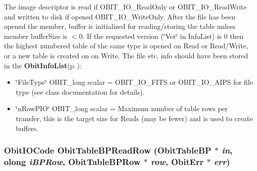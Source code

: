 The image descriptor is read if OBIT\_\-IO\_\-Read\-Only or OBIT\_\-IO\_\-Read\-Write and written to disk if opened OBIT\_\-IO\_\-Write\-Only. After the file has been opened the member, buffer is initialized for reading/storing the table unless member buffer\-Size is $<$0. If the requested version (\char`\"{}Ver\char`\"{} in Info\-List) is 0 then the highest numbered table of the same type is opened on Read or Read/Write, or a new table is created on on Write. The file etc. info should have been stored in the {\bf Obit\-Info\-List}{\rm (p.\,\pageref{structObitInfoList})}: \begin{itemize}
\item \char`\"{}File\-Type\char`\"{} OBIT\_\-long scalar = OBIT\_\-IO\_\-FITS or OBIT\_\-IO\_\-AIPS for file type (see class documentation for details). \item \char`\"{}n\-Row\-PIO\char`\"{} OBIT\_\-long scalar = Maximum number of table rows per transfer, this is the target size for Reads (may be fewer) and is used to create buffers. 
\end{itemize}
\subsubsection{\setlength{\rightskip}{0pt plus 5cm}Obit\-IOCode Obit\-Table\-BPRead\-Row ({\bf Obit\-Table\-BP} $\ast$ {\em in}, {\bf olong} {\em i\-BPRow}, {\bf Obit\-Table\-BPRow} $\ast$ {\em row}, {\bf Obit\-Err} $\ast$ {\em err})}\label{ObitTableBP_8h_a18}


